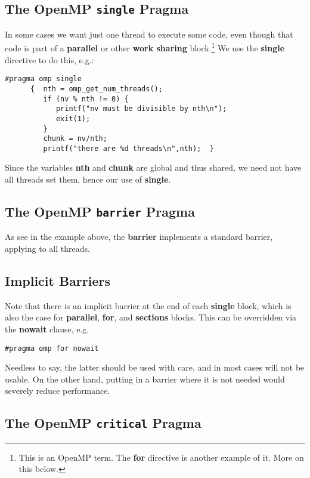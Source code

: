 \subsection{The OpenMP {\tt single} Pragma}

In some cases we want just one thread to execute some code, even though
that code is part of a {\bf parallel} or other {\bf work sharing}
block.\footnote{This is an OpenMP term.  The {\bf for} directive is another
example of it.  More on this below.}  We use the {\bf single} directive
to do this, e.g.:

\begin{Verbatim}[fontsize=\relsize{-2}]
      #pragma omp single
      {  nth = omp_get_num_threads();
         if (nv % nth != 0) {
            printf("nv must be divisible by nth\n");
            exit(1);
         }
         chunk = nv/nth;
         printf("there are %d threads\n",nth);  }
\end{Verbatim}

Since the variables {\bf nth} and {\bf chunk} are global and thus
shared, we need not have all threads set them, hence our use of {\bf
single}.

\subsection{The OpenMP {\tt barrier} Pragma}

As see in the example above, the {\bf barrier} implements a standard
barrier, applying to all threads.

\subsection{Implicit Barriers}

Note that there is an implicit barrier at the end of each {\bf single}
block, which is also the case for {\bf parallel}, {\bf for}, and {\bf
sections} blocks.  This can be overridden via the {\bf nowait} clause,
e.g.

\begin{Verbatim}[fontsize=\relsize{-2}]
#pragma omp for nowait
\end{Verbatim}

Needless to say, the latter should be used with care, and in most cases
will not be usable.  On the other hand, putting in a barrier where it is
not needed would severely reduce performance.

\subsection{The OpenMP {\tt critical} Pragma}

